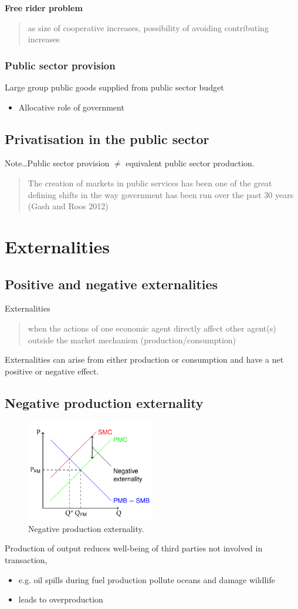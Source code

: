 \documentclass[class=report, crop=false, 12pt,a4paper]{standalone}
\begin{document}
\textbf{Free rider problem}
\begin{quote}
	as size of cooperative increases, possibility of avoiding contributing increases
\end{quote}
\subsubsection{Public sector provision}
Large group public goods supplied from public sector budget
\begin{itemize}
	\item Allocative role of government
\end{itemize}
\subsection{Privatisation in the public sector}
Note\dots Public sector provision $\neq$ equivalent public sector production.
\begin{quote}
	The creation of markets in public services has been one of the great defining shifts in the way government has been run over the past 30 years (Gash and Roos 2012)
\end{quote}
\section{Externalities}
\subsection{Positive and negative externalities}
Externalities
\begin{quote}
	when the actions of one economic agent directly affect other agent(s) outside the market mechanism (production/consumption)
\end{quote}
Externalities can arise from either production or consumption and have a net positive or negative effect. 
\subsection{Negative production externality}
\begin{figure}[H]
	\centering
	\includegraphics[width = 0.5\textwidth]{../img/figure16.png}
	\caption{Negative production externality.}
\end{figure}
Production of output reduces well-being of third parties not involved in transaction, 
\begin{itemize}
	\item e.g. oil spills during fuel production pollute oceans and damage wildlife
	\item leads to overproduction
\end{itemize}
\end{document}
